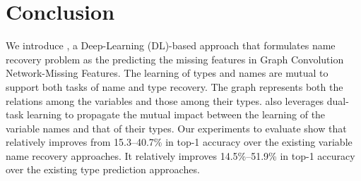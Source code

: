 \section{Conclusion}
\label{sec:conclusion}

We introduce {\tool}, a Deep-Learning (DL)-based approach that
formulates name recovery problem as the predicting the missing
features in Graph Convolution Network-Missing Features.  The learning
of types and names are mutual to support both tasks of name and type
recovery.  The graph represents both the relations among the variables
and those among their types. {\tool} also leverages dual-task learning
to propagate the mutual impact between the learning of the variable
names and that of their types. Our experiments to evaluate {\tool}
show that
{\tool} relatively improves from 15.3--40.7\% in top-1
accuracy over the existing variable name recovery approaches.
It relatively improves 14.5\%--51.9\% in top-1 accuracy over the
existing type prediction approaches.
